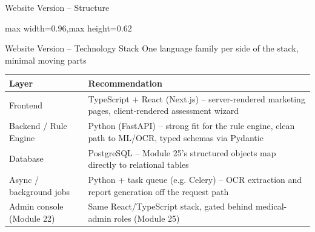 \documentclass[9pt,aspectratio=169]{beamer}
\begin{document}
\begin{frame}[t]{Website Version -- Structure}
\begin{center}
\begin{adjustbox}{max width=0.96\linewidth,max height=0.62\textheight}
\end{adjustbox}
\end{center}
\end{frame}

\begin{frame}[t]{Website Version -- Technology Stack}
\textcolor{black!55}{\scriptsize One language family per side of the stack, minimal moving parts}\\[2pt]
\begin{center}\scriptsize
\begin{tabular}{p{3.6cm}p{9.5cm}}
\toprule
\textbf{Layer} & \textbf{Recommendation} \\
\midrule
Frontend & TypeScript + React (Next.js) -- server-rendered marketing pages, client-rendered assessment wizard \\
Backend / Rule Engine & Python (FastAPI) -- strong fit for the rule engine, clean path to ML/OCR, typed schemas via Pydantic \\
Database & PostgreSQL -- Module 25's structured objects map directly to relational tables \\
Async / background jobs & Python + task queue (e.g. Celery) -- OCR extraction and report generation off the request path \\
Admin console (Module 22) & Same React/TypeScript stack, gated behind medical-admin roles (Module 25) \\
\bottomrule
\end{tabular}
\end{center}
\end{frame}
\end{document}
